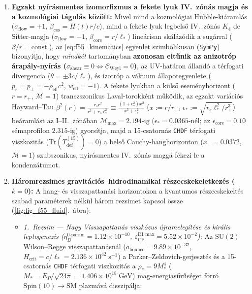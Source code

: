 \documentclass[11pt,a4paper]{article}
\theoremstyle{remark}
\begin{document}
\begin{enumerate}
  \item \textbf{Egzakt ny\'ir\'asmentes izomorfizmus a fekete lyuk IV.\ z\'on\'as magja \'es a kozmol\'ogiai t\'agul\'as k\"oz\"ott:} Mivel mind a kozmol\'ogiai Hubble-ki\'araml\'as ($\sigma_{\mathrm{flow}} = +1$, $\beta_{\mathrm{cos}} = H(t)r/c$), mind a fekete lyuk legbels\H{o} IV.\ z\'on\'as $K_4$ de Sitter-magja ($\sigma_{\mathrm{flow}} = -1$, $\beta_{\mathrm{core}} = r/\ell_*$) line\'arisan sk\'al\'az\'odik a sug\'arral ($\beta/r = \mathrm{const.}$), az \eqref{eq:f55_kinematics} egyenlet szimbolikusan (\texttt{SymPy}) bizony\'itja, hogy \emph{mindk\'et} tartom\'anyban \textbf{azonosan elt\H{u}nik az anizotr\'op \'arap\'aly-ny\'ir\'as ($\sigma_{\mathrm{shear}} \equiv 0 \iff \mathcal{C}_{\mathrm{Weyl}} = 0$)}, az UV-hat\'aron \'alland\'o a t\'erfogati divergencia ($\theta = \pm 3c/\ell_*$), \'es izotr\'op a v\'akuum \'allapotegyenlete ($p_r = p_\perp = -\rho_{\mathrm{eff}}c^2$, $w_{\mathrm{eff}} = -1$). A fekete lyukban a k\"uls\H{o} esem\'enyhorizont ($r = r_+$, $\mathcal{M} = 1$) transzszonikus Laval-torokk\'ent m\H{u}k\"odik, az egzakt vari\'aci\'os Hayward--Tau $\beta^2(r) = \frac{r_s r^2}{r^3 + r_s\ell_*^2} \equiv \frac{(1+\epsilon_*^2)x^2}{x^3+\epsilon_*^2}$ ($x := r/r_+$, $\epsilon_* := \sqrt{r_s\ell_*^2/r_+^3}$) be\'araml\'ast az I--II.\ z\'on\'aban $\mathcal{M}_{\max} = 2.194$-ig ($\epsilon_* = 0.0365$-n\'el; az $\epsilon_{\mathrm{core}} = 0.10$ s\'emaprofilon $2.315$-ig) gyors\'itja, majd a 15-csatorn\'as \texttt{CHDF} t\'erfogati viszkozit\'as ($\mathrm{Tr}(T_{\mathrm{def}}^{(15)}) = 0$) a bels\H{o} Cauchy-hanghorizonton ($x_- = 0.0372$, $\mathcal{M} = 1$) szubszonikus, ny\'ir\'asmentes IV.\ z\'on\'as magg\'a f\'ekezi le a kondenz\'atumot.
  \item \textbf{H\'aromrezsimes gravit\'aci\'os--hidrodinamikai r\'eszecskekeletkez\'es ($k = 0$):} A hang- \'es visszapattan\'asi horizontokon a kvantumos r\'eszecskekelt\'es szabad param\'eterek n\'elk\"ul h\'arom rezsimet kapcsol \"ossze (\ref{fig:fig_f55_fluid}.\ \'abra):
  \begin{itemize}
    \item \emph{1.\ Rezsim --- Nagy Visszapattan\'as viszk\'ozus \'ujrameleg\'it\'ese \'es kir\'alis leptogenezis ($\eta_B^{\mathrm{0\text{-}param}} = 1.12\times 10^{-10}$, $\varepsilon_{\mathrm{CP}}^{\mathrm{DI,max}} = 5.52\times 10^{-2}$):} Az $\mathrm{SU}(2)$ Wilson--Regge visszapattan\'asn\'al ($a_{\mathrm{bounce}} = 9.89\times 10^{-32}$, $H_{\mathrm{crit}} = c/\ell_* = 2.136\times 10^{42}\;\mathrm{s}^{-1}$) a Parker--Zeldovich-gerjeszt\'es \'es a 15-csatorn\'as \texttt{CHDF} t\'erfogati viszkozit\'as a $\rho_* = 9M_*^4$ ($M_* = E_P/\sqrt{24\pi} = 1.406\times 10^{18}\;\mathrm{GeV}$) mag-energias\H{u}r\H{u}s\'eget forr\'o $\mathrm{Spin}(10)\to\mathrm{SM}$ plazm\'av\'a disszip\'alja:

\end{itemize}
\end{enumerate}
\end{document}
